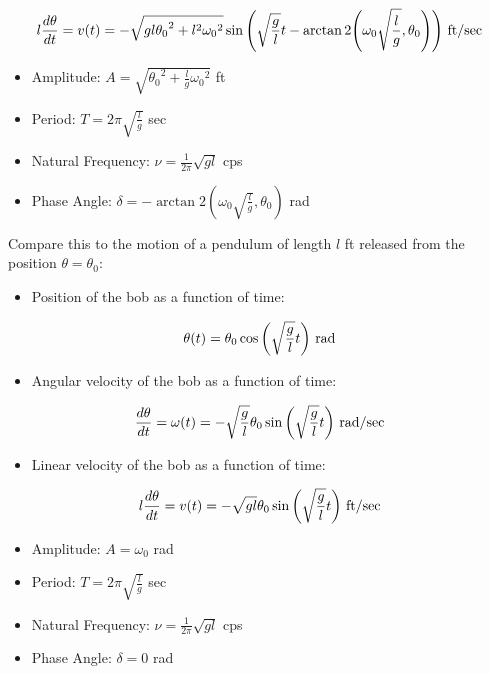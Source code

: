 \documentclass{article}
\begin{document}
\[ l \frac{d\theta}{dt} = v{(t)} = - \sqrt{ g l {\theta_0}^2 + l^2 { \omega_0}^2} \sin{\left(\sqrt{ \frac{g}{l}}t - \arctan2{\left(\omega_0 \sqrt{\frac{l}{g}}, { \theta_0}\right)}\right)} ~ \text{ft/sec} \]

\begin{itemize}
\item Amplitude: $A = \sqrt{ {\theta_0}^2 + \frac{l}{g}{ \omega_0}^2} $ ft
\item Period: $T = 2 \pi \sqrt{\frac{l}{g}}$ sec
\item Natural Frequency: $\nu = \frac{1}{2 \pi} \sqrt{gl} $ cps
\item Phase Angle: $\delta =  - \arctan2{( \omega_0 \sqrt{\frac{l}{g}}, \theta_0)} $ rad
\end{itemize}

Compare this to the motion of a pendulum of length $l$ ft released from the position $\theta = \theta_0$:

\begin{itemize}
\item Position of the bob as a function of time:
\end{itemize}

\[ \theta{(t)} = \theta_0 \cos{\left(\sqrt{\frac{g}{l}}t\right)} ~ \text{rad} \]

\begin{itemize}
\item Angular velocity of the bob as a function of time:
\end{itemize}

\[ \frac{d\theta}{dt} = \omega{(t)} = - \sqrt{\frac{g}{l}} {\theta_0} \sin{\left(\sqrt{ \frac{g}{l}}t\right)} ~ \text{rad/sec} \]

\begin{itemize}
\item Linear velocity of the bob as a function of time:
\end{itemize}

\[ l\frac{d\theta}{dt} = v{(t)} = - \sqrt{ g l } {\theta_0} \sin{\left(\sqrt{ \frac{g}{l}}t\right)} ~ \text{ft/sec} \]

\begin{itemize}
\item Amplitude: $A = \omega_0 $ rad
\item Period: $T = 2 \pi \sqrt{\frac{l}{g}}$ sec
\item Natural Frequency: $\nu = \frac{1}{2 \pi} \sqrt{gl} $ cps
\item Phase Angle: $\delta =  0$ rad
\end{itemize}
\end{document}
